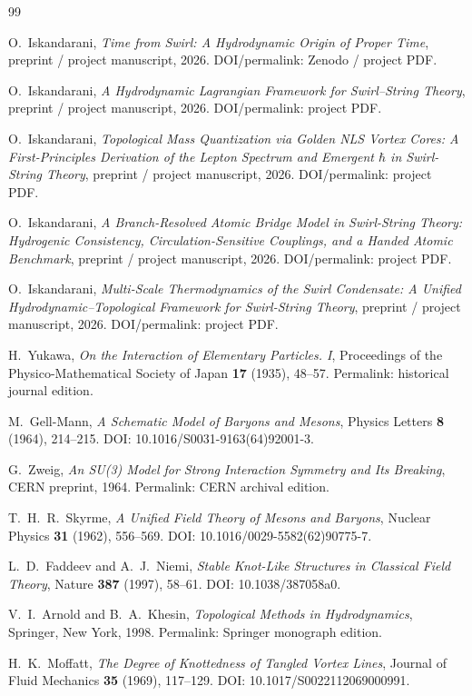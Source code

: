 \documentclass[11pt,a4paper]{article}
\begin{document}
\begin{thebibliography}{99}

O.~Iskandarani,
\emph{Time from Swirl: A Hydrodynamic Origin of Proper Time},
preprint / project manuscript, 2026.
DOI/permalink: Zenodo / project PDF.

O.~Iskandarani,
\emph{A Hydrodynamic Lagrangian Framework for Swirl--String Theory},
preprint / project manuscript, 2026.
DOI/permalink: project PDF.

O.~Iskandarani,
\emph{Topological Mass Quantization via Golden NLS Vortex Cores: A First-Principles Derivation of the Lepton Spectrum and Emergent \(\hbar\) in Swirl-String Theory},
preprint / project manuscript, 2026.
DOI/permalink: project PDF.

O.~Iskandarani,
\emph{A Branch-Resolved Atomic Bridge Model in Swirl-String Theory: Hydrogenic Consistency, Circulation-Sensitive Couplings, and a Handed Atomic Benchmark},
preprint / project manuscript, 2026.
DOI/permalink: project PDF.

O.~Iskandarani,
\emph{Multi-Scale Thermodynamics of the Swirl Condensate: A Unified Hydrodynamic--Topological Framework for Swirl-String Theory},
preprint / project manuscript, 2026.
DOI/permalink: project PDF.

H.~Yukawa,
\emph{On the Interaction of Elementary Particles. I},
Proceedings of the Physico-Mathematical Society of Japan \textbf{17} (1935), 48--57.
Permalink: historical journal edition.

M.~Gell-Mann,
\emph{A Schematic Model of Baryons and Mesons},
Physics Letters \textbf{8} (1964), 214--215.
DOI: 10.1016/S0031-9163(64)92001-3.

G.~Zweig,
\emph{An SU(3) Model for Strong Interaction Symmetry and Its Breaking},
CERN preprint, 1964.
Permalink: CERN archival edition.

T.~H.~R.~Skyrme,
\emph{A Unified Field Theory of Mesons and Baryons},
Nuclear Physics \textbf{31} (1962), 556--569.
DOI: 10.1016/0029-5582(62)90775-7.

L.~D.~Faddeev and A.~J.~Niemi,
\emph{Stable Knot-Like Structures in Classical Field Theory},
Nature \textbf{387} (1997), 58--61.
DOI: 10.1038/387058a0.

V.~I.~Arnold and B.~A.~Khesin,
\emph{Topological Methods in Hydrodynamics},
Springer, New York, 1998.
Permalink: Springer monograph edition.

H.~K.~Moffatt,
\emph{The Degree of Knottedness of Tangled Vortex Lines},
Journal of Fluid Mechanics \textbf{35} (1969), 117--129.
DOI: 10.1017/S0022112069000991.

\end{thebibliography}
\end{document}
